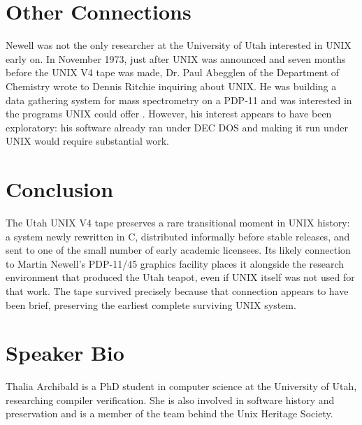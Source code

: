 \section{Other Connections}

Newell was not the only researcher at the University of Utah interested in UNIX early on.
In November 1973, just after UNIX was announced and seven months before the UNIX V4 tape was made, Dr. Paul Abegglen of the Department of Chemistry wrote to Dennis Ritchie inquiring about UNIX.
He was building a data gathering system for mass spectrometry on a PDP-11 and was interested in the programs UNIX could offer \cite{futrell75spectrometry}.
However, his interest appears to have been exploratory: his software already ran under DEC DOS and making it run under UNIX would require substantial work.

\section{Conclusion}

The Utah UNIX V4 tape preserves a rare transitional moment in UNIX history: a system newly rewritten in C, distributed informally before stable releases, and sent to one of the small number of early academic licensees.
Its likely connection to Martin Newell's PDP-11/45 graphics facility places it alongside the research environment that produced the Utah teapot, even if UNIX itself was not used for that work.
The tape survived precisely because that connection appears to have been brief, preserving the earliest complete surviving UNIX system.

\section{Speaker Bio}

Thalia Archibald is a PhD student in computer science at the University of Utah, researching compiler verification.
She is also involved in software history and preservation and is a member of the team behind the Unix Heritage Society.
